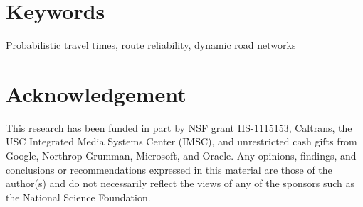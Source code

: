 \documentclass[]{sig-alternate}
\begin{document}
\section*{Keywords}
\vspace{-0.025in}
Probabilistic travel times, route reliability, dynamic road networks











\vspace{-0.1in}
\section*{Acknowledgement}

This research has been funded in part by NSF grant IIS-1115153, Caltrans, the USC Integrated Media Systems Center (IMSC), and unrestricted cash gifts from Google, Northrop Grumman, Microsoft, and Oracle. Any opinions, findings, and conclusions or recommendations expressed in this material are those of the author(s) and do not necessarily reflect the views of any of the sponsors such as the National Science Foundation.

\begin{scriptsize}


\end{scriptsize}
\end{document}
